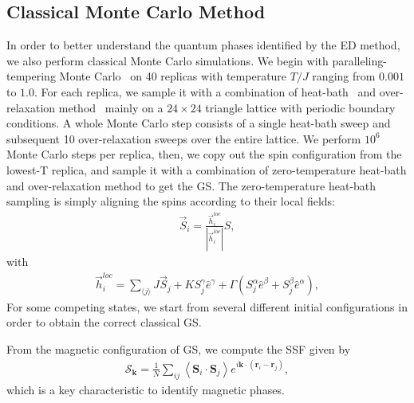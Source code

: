 \documentclass[aps,prb,reprint,amsfonts,amsmath,amssymb,showpacs,groupedaddress,superscriptaddress]{revtex4-1}
\begin{document}
\subsection{\label{subsec:MethodMC}Classical Monte Carlo Method}

In order to better understand the quantum phases identified by the ED method, we also perform classical Monte Carlo simulations. We begin with paralleling-tempering Monte Carlo~\cite{Hukushima96} on 40 replicas with temperature $T/J$ ranging from $0.001$ to $1.0$. For each replica, we sample it with a combination of heat-bath~\cite{Miyatake84} and over-relaxation method~\cite{Berg} mainly on a $24 \times 24$ triangle lattice with periodic boundary conditions. A whole Monte Carlo step consists of a single heat-bath sweep and subsequent 10 over-relaxation sweeps over the entire lattice. We perform $10^6$ Monte Carlo steps per replica, then, we copy out the spin configuration from the lowest-T replica, and sample it with a combination of zero-temperature heat-bath and over-relaxation method to get the GS. The zero-temperature heat-bath sampling is simply aligning the spins according to their local fields:
\begin{align}
    \vec{S}_{i} = \frac{\vec{h}_{i}^{loc}}{|\vec{h}_{i}^{loc}|} S,
\end{align}
with
\begin{align}
    \vec{h}_{i}^{loc} = \sum_{\langle j \rangle} J \vec{S}_{j} + K {S}^{\gamma}_{j} \hat{e}^{\gamma} + \Gamma (S^{\alpha}_{j} \hat{e}^{\beta} + S^{\beta}_{j} \hat{e}^{\alpha}),
\end{align}
For some competing states, we start from several different initial configurations in order to obtain the correct classical GS.

From the magnetic configuration of GS, we compute the SSF given by
\begin{align}
    \mathcal{S}_{\bm{k}} = \frac{1}{N} \sum_{ij} \left \langle \bm{S}_i \cdot \bm{S}_j \right \rangle e^{i \bm{k} \cdot (\bm{r}_i-\bm{r}_j)},
\end{align}
which is a key characteristic to identify magnetic phases.
\end{document}
